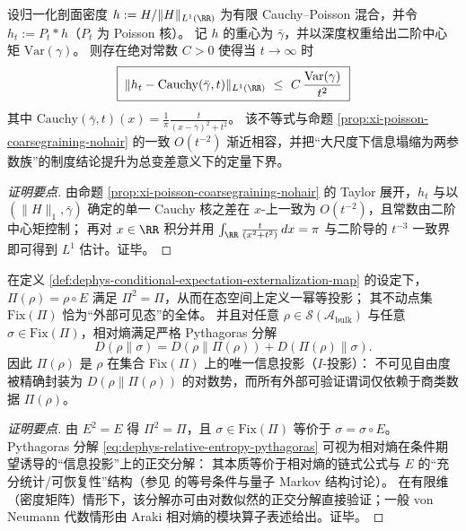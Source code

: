 \begin{corollary}\label{cor:dephys-poisson-tv-bound-variance}
设归一化剖面密度 \(h:=H/\|H\|_{L^1(\RR)}\) 为有限 Cauchy--Poisson 混合，并令 \(h_t:=P_t*h\)（\(P_t\) 为 Poisson 核）。
记 \(h\) 的重心为 \(\bar\gamma\)，并以深度权重给出二阶中心矩
\(
\mathrm{Var}(\gamma)
\)。
则存在绝对常数 \(C>0\) 使得当 \(t\to\infty\) 时
\[
\boxed{\;
\|h_t-\mathrm{Cauchy}(\bar\gamma,t)\|_{L^1(\RR)}
\ \le\ C\,\frac{\mathrm{Var}(\gamma)}{t^2}\;}
\]
其中 \(\mathrm{Cauchy}(\bar\gamma,t)(x)=\frac{1}{\pi}\frac{t}{(x-\bar\gamma)^2+t^2}\)。
该不等式与命题 \ref{prop:xi-poisson-coarsegraining-nohair} 的一致 \(O(t^{-2})\) 渐近相容，并把“大尺度下信息塌缩为两参数族”的制度结论提升为总变差意义下的定量下界。
\end{corollary}

\begin{proof}[证明要点]
由命题 \ref{prop:xi-poisson-coarsegraining-nohair} 的 Taylor 展开，\(h_t\) 与以 \((\|H\|_1,\bar\gamma)\) 确定的单一 Cauchy 核之差在 \(x\)-上一致为 \(O(t^{-2})\)，且常数由二阶中心矩控制；
再对 \(x\in\RR\) 积分并用 \(\int_{\RR}\frac{t}{(x^2+t^2)}\,dx=\pi\) 与二阶导的 \(t^{-3}\) 一致界即可得到 \(L^1\) 估计。证毕。
\end{proof}

\begin{theorem}\label{thm:dephys-idempotent-monad-i-projection}
在定义 \ref{def:dephys-conditional-expectation-externalization-map} 的设定下，\(\Pi(\rho)=\rho\circ E\) 满足 \(\Pi^2=\Pi\)，从而在态空间上定义一幂等投影；
其不动点集 \(\mathrm{Fix}(\Pi)\) 恰为“外部可见态”的全体。
并且对任意 \(\rho\in\mathcal{S}(\mathcal{A}_{\mathrm{bulk}})\) 与任意 \(\sigma\in\mathrm{Fix}(\Pi)\)，相对熵满足严格 Pythagoras 分解
\begin{equation}\label{eq:dephys-relative-entropy-pythagoras}
\boxed{\;
D(\rho\|\sigma)=D(\rho\|\Pi(\rho)) + D(\Pi(\rho)\|\sigma).\;}
\end{equation}
因此 \(\Pi(\rho)\) 是 \(\rho\) 在集合 \(\mathrm{Fix}(\Pi)\) 上的唯一信息投影（\(I\)-投影）：
不可见自由度被精确封装为 \(D(\rho\|\Pi(\rho))\) 的对数势，而所有外部可验证谓词仅依赖于商类数据 \(\Pi(\rho)\)。
\end{theorem}

\begin{proof}[证明要点]
由 \(E^2=E\) 得 \(\Pi^2=\Pi\)，且 \(\sigma\in\mathrm{Fix}(\Pi)\) 等价于 \(\sigma=\sigma\circ E\)。
Pythagoras 分解 \eqref{eq:dephys-relative-entropy-pythagoras} 可视为相对熵在条件期望诱导的“信息投影”上的正交分解：
其本质等价于相对熵的链式公式与 \(E\) 的“充分统计/可恢复性”结构（参见 \cite{Petz2003MonotonicityRelativeEntropyRevisited} 的等号条件与量子 Markov 结构讨论）。
在有限维（密度矩阵）情形下，该分解亦可由对数似然的正交分解直接验证；一般 von Neumann 代数情形由 Araki 相对熵的模块算子表述给出。证毕。
\end{proof}


